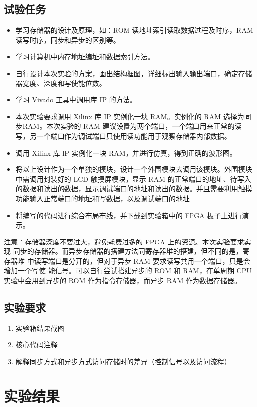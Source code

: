\documentclass[AutoFakeBold]{LZUThesis}
\begin{document}
\section{试验任务}
\begin{itemize}
    \item 学习存储器的设计及原理，如：ROM 读地址索引读取数据过程及时序，RAM 读写时序，同步和异步的区别等。
    \item 学习计算机中内存地址编址和数据索引方法。
    \item 自行设计本次实验的方案，画出结构框图，详细标出输入输出端口，确定存储器宽度、深度和写使能位数。
    \item 学习 Vivado 工具中调用库 IP 的方法。
    \item 本次实验要求调用 Xilinx 库 IP 实例化一块 RAM。实例化的 RAM 选择为同步RAM。本次实验的 RAM 建议设置为两个端口，一个端口用来正常的读写，另一个端口作为调试端口只使用读功能用于观察存储器内部数据。
    \item 调用 Xilinx 库 IP 实例化一块 RAM，并进行仿真，得到正确的波形图。
    \item 将以上设计作为一个单独的模块，设计一个外围模块去调用该模块。外围模块中需调用封装好的 LCD 触摸屏模块，显示 RAM 的正常端口的地址、待写入的数据和读出的数据，显示调试端口的地址和读出的数据。并且需要利用触摸功能输入正常端口的地址和写数据，以及调试端口的地址
    \item 将编写的代码进行综合布局布线，并下载到实验箱中的 FPGA 板子上进行演示。
\end{itemize}

注意：存储器深度不要过大，避免耗费过多的 FPGA 上的资源。本次实验要求实现
同步的存储器。而异步存储器的搭建方法同寄存器堆的搭建，但不同的是，寄存器堆
中读写端口是分开的，但对于异步 RAM 要求读写共用一个端口，只是会增加一个写使
能信号。可以自行尝试搭建异步的 ROM 和 RAM，在单周期 CPU 实验中会用到异步的 ROM
作为指令存储器，而异步 RAM 作为数据存储器。
\section{实验要求}
\begin{enumerate}
    \item 实验箱结果截图
    \item 核心代码注释
    \item 解释同步方式和异步方式访问存储时的差异（控制信号以及访问流程）
\end{enumerate}

\chapter{实验结果}
\end{document}
